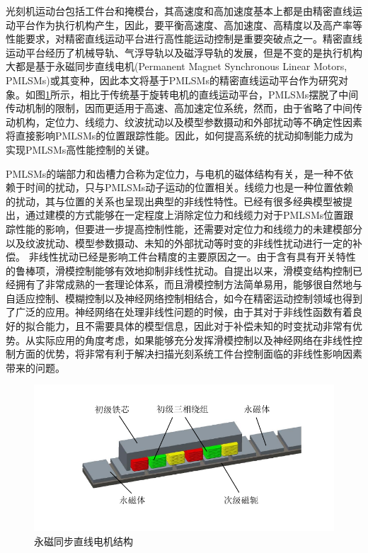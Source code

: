 光刻机运动台包括工件台和掩模台，其高速度和高加速度基本上都是由精密直线运动平台作为执行机构产生\cite{butler2011position}，因此，要平衡高速度、高加速度、高精度以及高产率等性能要求，对精密直线运动平台进行高性能运动控制是重要突破点之一。精密直线运动平台经历了机械导轨、气浮导轨以及磁浮导轨的发展，但是不变的是执行机构大都是基于永磁同步直线电机(Permanent Magnet Synchronous Linear Motors, PMLSMs)或其变种，因此本文将基于PMLSMs的精密直线运动平台作为研究对象。如图\ref{直线电机结构}所示，相比于传统基于旋转电机的直线运动平台，PMLSMs摆脱了中间传动机制的限制，因而更适用于高速、高加速定位系统，然而，由于省略了中间传动机构，定位力、线缆力、纹波扰动以及模型参数摄动和外部扰动等不确定性因素将直接影响PMLSMs的位置跟踪性能\cite{wang2015detent}。因此，如何提高系统的扰动抑制能力成为实现PMLSMs高性能控制的关键\cite{yang2018investigation}。

PMLSMs的端部力和齿槽力合称为定位力，与电机的磁体结构有关，是一种不依赖于时间的扰动，只与PMLSMs动子运动的位置相关。线缆力也是一种位置依赖的扰动，其与位置的关系也呈现出典型的非线性特性\cite{yang2018integrated}。已经有很多经典模型被提出\cite{tan2002robust,chen2009modeling,wassink2005lpv}，通过建模的方式能够在一定程度上消除定位力和线缆力对于PMLSMs位置跟踪性能的影响，但要进一步提高控制性能，还需要对定位力和线缆力的未建模部分以及纹波扰动、模型参数摄动、未知的外部扰动等时变的非线性扰动进行一定的补偿。
非线性扰动已经是影响工件台精度的主要原因之一。由于含有具有开关特性的鲁棒项，滑模控制能够有效地抑制非线性扰动\cite{heertjes2014self,li2016state}。自提出以来，滑模变结构控制已经拥有了非常成熟的一套理论体系\cite{young1999control}，而且滑模控制方法简单易用，能够很自然地与自适应控制\cite{huang2008adaptive}、模糊控制\cite{tong2003fuzzy}以及神经网络控制\cite{qi2013adaptive}相结合，如今在精密运动控制领域也得到了广泛的应用。神经网络在处理非线性问题的时候，由于其对于非线性函数有着良好的拟合能力，且不需要具体的模型信息，因此对于补偿未知的时变扰动非常有优势。从实际应用的角度考虑，如果能够充分发挥滑模控制以及神经网络在非线性控制方面的优势，将非常有利于解决扫描光刻系统工件台控制面临的非线性影响因素带来的问题。
\begin{figure}[!t]
	\centering
	\includegraphics[width=12cm]{figures/直线电机结构图.pdf}
	\caption{永磁同步直线电机结构}
	\label{直线电机结构}
\end{figure}



